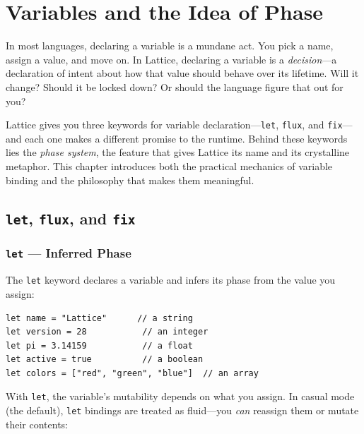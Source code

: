 \chapter{Variables and the Idea of Phase}\label{ch:variables-phase}


In most languages, declaring a variable is a mundane act.
You pick a name, assign a value, and move on.
In Lattice, declaring a variable is a \emph{decision}---a declaration of intent about how that value should behave over its lifetime.
Will it change?
Should it be locked down?
Or should the language figure that out for you?

Lattice gives you three keywords for variable declaration---\lstinline|let|, \lstinline|flux|, and \lstinline|fix|---and each one makes a different promise to the runtime.
Behind these keywords lies the \emph{phase system}, the feature that gives Lattice its name and its crystalline metaphor.
This chapter introduces both the practical mechanics of variable binding and the philosophy that makes them meaningful.

\section{\texttt{let}, \texttt{flux}, and \texttt{fix}}\label{sec:let-flux-fix}

\subsection{\texttt{let} --- Inferred Phase}\label{subsec:let}

The \lstinline|let| keyword declares a variable and infers its phase from the value you assign:

\begin{lstlisting}[language=Lattice, caption={Declaring variables with let}]
let name = "Lattice"      // a string
let version = 28           // an integer
let pi = 3.14159           // a float
let active = true          // a boolean
let colors = ["red", "green", "blue"]  // an array
\end{lstlisting}

With \lstinline|let|, the variable's mutability depends on what you assign.
In casual mode (the default), \lstinline|let| bindings are treated as fluid---you \emph{can} reassign them or mutate their contents:

